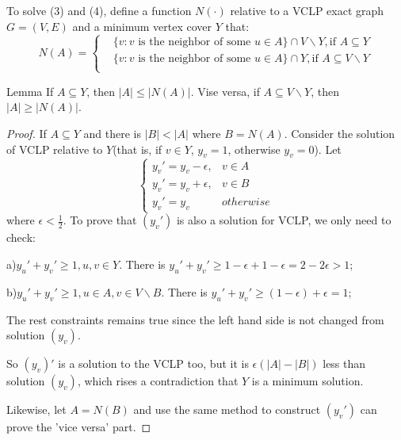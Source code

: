    To solve (3) and (4), define a function $N(\cdot)$ relative to 
    a VCLP exact graph $G=(V,E)$ and a minimum vertex cover $Y$ that: 
    \begin{equation*}
        N(A)=\begin{cases}
                &\{v:v\text{ is the neighbor of some }u\in A\}\cap V\backslash Y, \text{if }A\subseteq Y\\
                &\{v:v\text{ is the neighbor of some }u\in A\}\cap Y, \text{if }A\subseteq V\backslash Y\\
            \end{cases}
    \end{equation*}
    \begin{thm}{Lemma}{}
        If $A\subseteq Y$, then $|A|\leq |N(A)|$. Vise versa, 
        if $A\subseteq V\backslash Y$, then $|A|\geq |N(A)|$. 
    \end{thm}
    \begin{proof}
        If $A\subseteq Y$ and there is $|B|<|A|$ where $B=N(A)$. 
        Consider the solution of VCLP relative to $Y$(that is, if $v\in Y$, $y_v=1$, otherwise $y_v=0$). Let 
        \begin{equation*}
            \begin{cases}
                y_v'=y_v-\epsilon,&v\in A\\
                y_v'=y_v+\epsilon,&v\in B\\
                y_v'=y_v & otherwise
            \end{cases}
        \end{equation*}
        where $\epsilon < \frac{1}{2}$. To prove that $(y_v')$ is also a solution for VCLP, we only need to check: 

        a)$y_u'+y_v'\geq 1,u,v\in Y$. There is $y_u'+y_v'\geq 1-\epsilon+1-\epsilon=2-2\epsilon>1$; 

        b)$y_u'+y_v'\geq 1,u\in A,v\in V\backslash B$. There is $y_u'+y_v'\geq (1-\epsilon) + \epsilon=1$; 

        The rest constraints remains true since the left hand side is not changed from solution $(y_v)$. 

        So $(y_v)'$ is a solution to the VCLP too, but it is $\epsilon(|A|-|B|)$ less than solution $(y_v)$, which rises a contradiction that $Y$ is a minimum solution. 
        
        Likewise, let $A=N(B)$ and use the same method to construct $(y_v')$ can prove the 'vice versa' part. 
    \end{proof}

